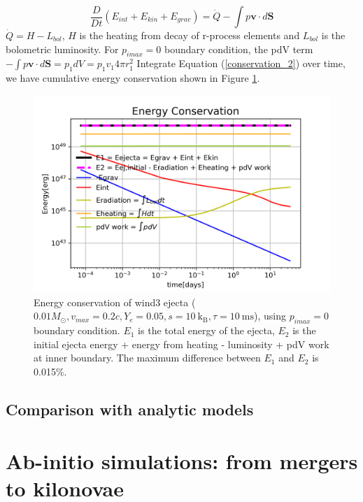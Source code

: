 \documentclass[fleqn,usenatbib]{mnras}
\begin{document}
\begin{equation}
\label{conservation_2}
	\frac{D}{Dt}(E_{int} + E_{kin}+E_{grav}) = \dot Q - \int p \boldsymbol{v} \cdot d \boldsymbol{S} 
\end{equation}
$\dot Q = H - L_{bol}$, $H$ is the heating from decay of r-process elements and $L_{bol}$ is the bolometric luminosity. For $p_{imax}=0$ boundary condition, the pdV term $-\int p \boldsymbol{v} \cdot d \boldsymbol{S} = p_{1} dV = p_{1} v_1 4\pi r_1^2$  
Integrate Equation (\ref{conservation_2}) over time, we have cumulative energy conservation shown in Figure \ref{energy_conservation}.
 

\begin{figure}
\centering
\includegraphics[scale=0.65]{figures/energy_conservation_wind3_Apr2.png}
\caption{Energy conservation of wind3 ejecta ($0.01M_{\odot}, v_{max}=0.2c, Y_e=0.05, s=10\ \mathrm{k_B}, \tau=10\ \mathrm{ ms}$), using $p_{imax}=0$ boundary condition. $E_1$ is the total energy of the ejecta, $E_2$ is the initial ejecta energy + energy from heating - luminosity + pdV work at inner boundary. The maximum difference between $E_1$ and $E_2$ is 0.015\%.}
\label{energy_conservation}
\end{figure}



\subsection{Comparison with analytic models}

\section{Ab-initio simulations: from mergers to kilonovae}
\end{document}
